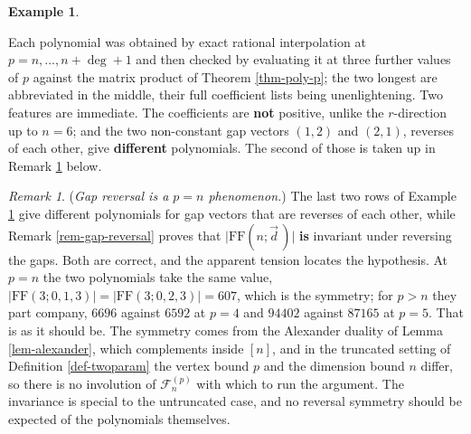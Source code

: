 \documentclass[11pt, a4paper, abstract=yes]{scrartcl}
\theoremstyle{definition}
\newtheorem{mexample}[definition]{Example}
\theoremstyle{remark}
\newtheorem{remark}[definition]{Remark}
\theoremstyle{plain}
\begin{document}
\begin{mexample}
\begin{center}
\end{center}
\endgroup
Each polynomial was obtained by exact rational interpolation at \(p=n,\dots,n+\deg+1\) and then
checked by evaluating it at three further values of \(p\) against the matrix product of
Theorem \ref{thm-poly-p}; the two longest are abbreviated in the middle, their full coefficient lists
being unenlightening. Two features are immediate. The coefficients are \textbf{not} positive, unlike the
\(r\)-direction up to \(n=6\); and the two non-constant gap vectors \((1,2)\) and \((2,1)\), reverses
of each other, give \textbf{different} polynomials. The second of those is taken up in
Remark \ref{rem-reversal-only-at-p-n} below.
\label{ex-poly-p-tables}
\end{mexample}

\begin{remark}
(\emph{Gap reversal is a \(p=n\) phenomenon.}) The last two rows of Example \ref{ex-poly-p-tables} give
different polynomials for gap vectors that are reverses of each other, while
Remark \ref{rem-gap-reversal} proves that \(\lvert\mathrm{FF}(n;\vec d\,)\rvert\) \textbf{is} invariant under
reversing the gaps. Both are correct, and the apparent tension locates the hypothesis. At \(p=n\) the
two polynomials take the same value, \(\lvert\mathrm{FF}(3;0,1,3)\rvert=\lvert\mathrm{FF}(3;0,2,3)\rvert=607\),
which is the symmetry; for \(p>n\) they part company, \(6696\) against \(6592\) at \(p=4\) and
\(94402\) against \(87165\) at \(p=5\). That is as it should be. The symmetry comes from the Alexander
duality of Lemma \ref{lem-alexander}, which complements inside \([n]\), and in the truncated setting of
Definition \ref{def-twoparam} the vertex bound \(p\) and the dimension bound \(n\) differ, so there is
no involution of \(\mathcal F_n^{(p)}\) with which to run the argument. The invariance is special to
the untruncated case, and no reversal symmetry should be expected of the polynomials themselves.
\label{rem-reversal-only-at-p-n}
\end{remark}
\end{document}
